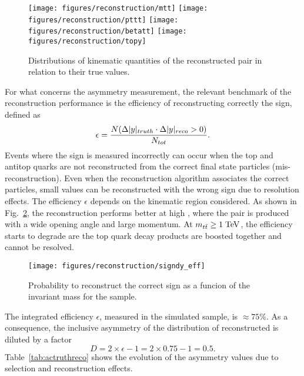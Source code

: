 \begin{figure}[!htb]\centering
  \texttt{[image: figures/reconstruction/mtt]}
  \texttt{[image: figures/reconstruction/pttt]}
  \texttt{[image: figures/reconstruction/betatt]}
  \texttt{[image: figures/reconstruction/topy]}
  \caption{
    \label{fig:reso}
    Distributions of kinematic quantities of the
    reconstructed \ttbar{} pair in relation to their true values.
  }
\end{figure} 

For what concerns the asymmetry measurement, the relevant benchmark of
the reconstruction performance is the efficiency of reconstructing
correctly the \dy{} sign, defined as
\begin{equation}
  \label{eq:dysign}
  \epsilon = \frac{N(\Delta|y|{}_{truth}\cdot\Delta|y|{}_{reco}>0)}{N_{tot}}.
\end{equation}
Events where the \dy{} sign is measured incorrectly can occur when the top and
antitop quarks are not reconstructed from the correct final
state particles (mis-reconstruction). Even when the reconstruction
algorithm associates the correct particles, small \dy{} values can be
reconstructed with the wrong sign due to resolution effects.
The efficiency $\epsilon$ depends on the kinematic region
considered. As shown in Fig.~\ref{fig:dysign}, the \dy{} reconstruction performs
better at high \mtt{}, where the \ttbar{} pair is produced with a wide
opening angle and large momentum. At $m_{t\bar{t}}{}\geq1\; \mathrm{TeV}{}$, the efficiency
starts to degrade are the top quark decay products are boosted together and
cannot be resolved.

\begin{figure}[!htb]\centering
  \texttt{[image: figures/reconstruction/signdy\_eff]}
  \caption{
    \label{fig:dysign}
    Probability to reconstruct the correct \dy{} sign as a funcion of
    the \ttbar{} invariant mass \mtt{} for the \mujets{} sample.
  }
\end{figure}

The integrated efficiency $\epsilon$, measured in the \ttbar{} simulated sample,
is $\approx75\%$. As a consequence, the inclusive asymmetry of the distribution
of reconstructed \dy{} is diluted by a factor 
\begin{equation}
  \label{eq:dilution}
D = 2\times{}\epsilon - 1=2\times0.75-1=0.5.
\end{equation}  
Table~\ref{tab:actruthreco} shows the evolution of the asymmetry
values due to selection and reconstruction effects. 

